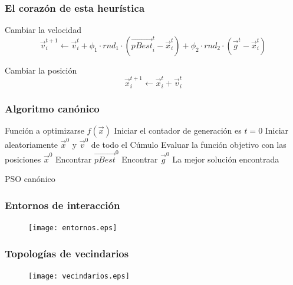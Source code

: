 \documentclass[10pt,compress]{beamer}
\begin{document}
\begin{frame}
	\frametitle{El coraz\'on de esta heur\'istica}
	\begin{block}{Cambiar la velocidad}
	\[
	  \vec{v}^{t+1}_{i} \leftarrow \vec{v}^t_i + \phi_1 \cdot rnd_1 \cdot \left(\vec{pBest}^t_i - \vec{x}^t_i \right) 
					    + \phi_2 \cdot rnd_2 \cdot \left(\vec{g}^t - \vec{x}^t_i \right) 
    \]	
		\end{block}
	\begin{block}{Cambiar la posici\'on}
		\[
	  \vec{x}^{t+1}_i \leftarrow  \vec{x}^t_i + \vec{v}^t_i
      \]
  \end{block}
\end{frame}
\begin{frame}
	\frametitle{Algoritmo can\'onico}
	   \begin{algorithm}[H]
				Funci\'on a optimizarse $f\left(\vec{x}\right)$\;	
				Iniciar el contador de generaci\'on es $t=0$\;
				Iniciar aleatoriamente $\vec{x}^0$ y $\vec{v}^0$ de todo el C\'umulo \;
				Evaluar la funci\'on objetivo con las posiciones $\vec{x}^{0}$\;
				Encontrar $\vec{pBest}^0$\;
				Encontrar $\vec{g}^0$\;
			\Return La mejor soluci\'on encontrada\;
		\caption{PSO can\'onico}
\end{algorithm}
\end{frame}

\begin{frame}
	\frametitle{Entornos de interacci\'on}
	\begin{figure}
	\centering
	\texttt{[image: entornos.eps]}	  
      
      \end{figure}
\end{frame}
\begin{frame}
	\frametitle{Topolog\'ias de vecindarios}
 \begin{figure}
	\centering
	\texttt{[image: vecindarios.eps]}	
 
      \end{figure}
\end{frame}
\end{document}
